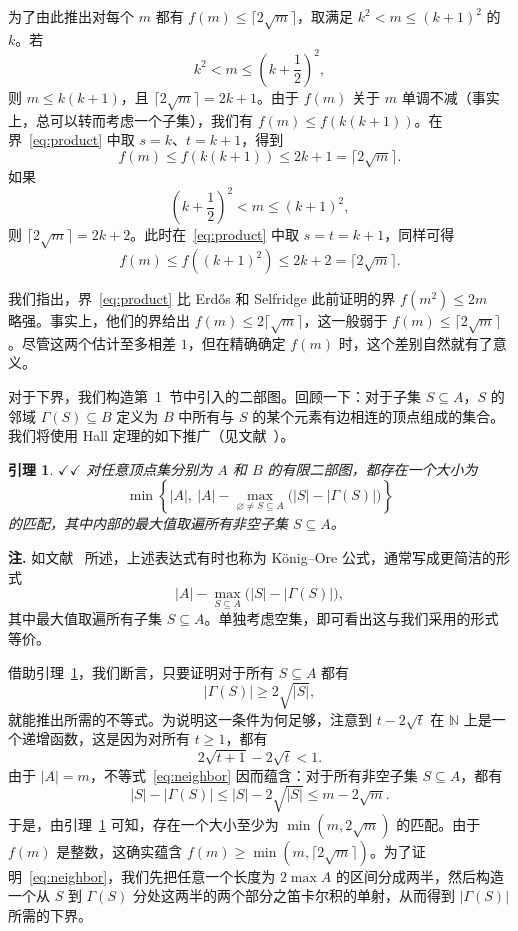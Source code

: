 \documentclass[UTF8,a4paper,oneside,openany,fontset=fandol,zihao=-4]{ctexbook}
\theoremstyle{chinesestyle}
\newtheorem{lemma}[theorem]{引理}
\newcommand{\leanmark}{\ensuremath{\checkmark\!\checkmark}}
\begin{document}
为了由此推出对每个 $m$ 都有 $f(m)\leq\lceil 2\sqrt m\rceil$，取满足 $k^2<m\leq(k+1)^2$ 的 $k$。若
\[
k^2<m\leq\left(k+\frac12\right)^2,
\]
则 $m\leq k(k+1)$，且 $\lceil 2\sqrt m\rceil=2k+1$。由于 $f(m)$ 关于 $m$ 单调不减（事实上，总可以转而考虑一个子集），我们有 $f(m)\leq f(k(k+1))$。在界~\eqref{eq:product} 中取 $s=k$、$t=k+1$，得到
\[
f(m)\leq f(k(k+1))\leq 2k+1=\lceil 2\sqrt m\rceil.
\]
如果
\[
\left(k+\frac12\right)^2<m\leq(k+1)^2,
\]
则 $\lceil 2\sqrt m\rceil=2k+2$。此时在~\eqref{eq:product} 中取 $s=t=k+1$，同样可得
\[
f(m)\leq f((k+1)^2)\leq 2k+2=\lceil 2\sqrt m\rceil.
\]

我们指出，界~\eqref{eq:product} 比 Erd\H{o}s 和 Selfridge 此前证明的界 $f(m^2)\leq 2m$~\cite{ref7,ref8} 略强。事实上，他们的界给出 $f(m)\leq 2\lceil\sqrt m\rceil$，这一般弱于 $f(m)\leq\lceil 2\sqrt m\rceil$。尽管这两个估计至多相差 $1$，但在精确确定 $f(m)$ 时，这个差别自然就有了意义。

对于下界，我们构造第~1~节中引入的二部图。回顾一下：对于子集 $S\subseteq A$，$S$ 的邻域 $\Gamma(S)\subseteq B$ 定义为 $B$ 中所有与 $S$ 的某个元素有边相连的顶点组成的集合。我们将使用 Hall 定理的如下推广（见文献~\cite[习题~16.2.8(b)]{ref4}）。

\begin{lemma}\label{lem:hall}
\leanmark{} 对任意顶点集分别为 $A$ 和 $B$ 的有限二部图，都存在一个大小为
\[
\min\left\{|A|,\ |A|-\max_{\varnothing\ne S\subseteq A}
\bigl(|S|-|\Gamma(S)|\bigr)\right\}
\]
的匹配，其中内部的最大值取遍所有非空子集 $S\subseteq A$。
\end{lemma}

\par\noindent\textbf{注.} 如文献~\cite{ref4} 所述，上述表达式有时也称为 K\"onig--Ore 公式，通常写成更简洁的形式
\[
|A|-\max_{S\subseteq A}\bigl(|S|-|\Gamma(S)|\bigr),
\]
其中最大值取遍所有子集 $S\subseteq A$。单独考虑空集，即可看出这与我们采用的形式等价。

借助引理~\ref{lem:hall}，我们断言，只要证明对于所有 $S\subseteq A$ 都有
\begin{equation}
|\Gamma(S)|\geq 2\sqrt{|S|},\tag{2}\label{eq:neighbor}
\end{equation}
就能推出所需的不等式。为说明这一条件为何足够，注意到 $t-2\sqrt t$ 在 $\mathbb N$ 上是一个递增函数，这是因为对所有 $t\geq 1$，都有
\[
2\sqrt{t+1}-2\sqrt t<1.
\]
由于 $|A|=m$，不等式~\eqref{eq:neighbor} 因而蕴含：对于所有非空子集 $S\subseteq A$，都有
\[
|S|-|\Gamma(S)|\leq |S|-2\sqrt{|S|}\leq m-2\sqrt m.
\]
于是，由引理~\ref{lem:hall} 可知，存在一个大小至少为 $\min(m,2\sqrt m)$ 的匹配。由于 $f(m)$ 是整数，这确实蕴含 $f(m)\geq\min(m,\lceil 2\sqrt m\rceil)$。为了证明~\eqref{eq:neighbor}，我们先把任意一个长度为 $2\max A$ 的区间分成两半，然后构造一个从 $S$ 到 $\Gamma(S)$ 分处这两半的两个部分之笛卡尔积的单射，从而得到 $|\Gamma(S)|$ 所需的下界。
\end{document}
